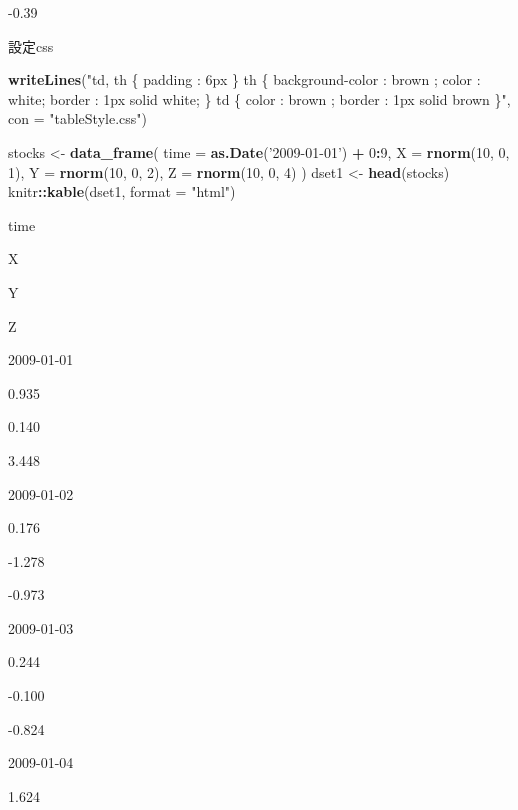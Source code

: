 \documentclass[]{book}
\newenvironment{Shaded}{\begin{snugshade}}{\end{snugshade}}
\newcommand{\KeywordTok}[1]{\textcolor[rgb]{0.13,0.29,0.53}{\textbf{#1}}}
\newcommand{\DataTypeTok}[1]{\textcolor[rgb]{0.13,0.29,0.53}{#1}}
\newcommand{\DecValTok}[1]{\textcolor[rgb]{0.00,0.00,0.81}{#1}}
\newcommand{\StringTok}[1]{\textcolor[rgb]{0.31,0.60,0.02}{#1}}
\newcommand{\OperatorTok}[1]{\textcolor[rgb]{0.81,0.36,0.00}{\textbf{#1}}}
\newcommand{\NormalTok}[1]{#1}
\theoremstyle{definition}
\theoremstyle{definition}
\theoremstyle{definition}
\theoremstyle{remark}
\begin{document}
-0.39

設定css

\begin{Shaded}
\begin{Highlighting}[]
\KeywordTok{writeLines}\NormalTok{(}\StringTok{"td, th \{ padding : 6px \} th \{ background-color : brown ; color : white; border : 1px solid white; \} td \{ color : brown ; border : 1px solid brown \}"}\NormalTok{, }\DataTypeTok{con =} \StringTok{"tableStyle.css"}\NormalTok{)}
\end{Highlighting}
\end{Shaded}

\begin{Shaded}
\begin{Highlighting}[]
\NormalTok{stocks <-}\StringTok{ }\KeywordTok{data_frame}\NormalTok{(}
  \DataTypeTok{time =} \KeywordTok{as.Date}\NormalTok{(}\StringTok{'2009-01-01'}\NormalTok{) }\OperatorTok{+}\StringTok{ }\DecValTok{0}\OperatorTok{:}\DecValTok{9}\NormalTok{,}
  \DataTypeTok{X =} \KeywordTok{rnorm}\NormalTok{(}\DecValTok{10}\NormalTok{, }\DecValTok{0}\NormalTok{, }\DecValTok{1}\NormalTok{),}
  \DataTypeTok{Y =} \KeywordTok{rnorm}\NormalTok{(}\DecValTok{10}\NormalTok{, }\DecValTok{0}\NormalTok{, }\DecValTok{2}\NormalTok{),}
  \DataTypeTok{Z =} \KeywordTok{rnorm}\NormalTok{(}\DecValTok{10}\NormalTok{, }\DecValTok{0}\NormalTok{, }\DecValTok{4}\NormalTok{)}
\NormalTok{)}
\NormalTok{dset1 <-}\StringTok{ }\KeywordTok{head}\NormalTok{(stocks)}
\NormalTok{knitr}\OperatorTok{::}\KeywordTok{kable}\NormalTok{(dset1, }\DataTypeTok{format =} \StringTok{"html"}\NormalTok{)}
\end{Highlighting}
\end{Shaded}

time

X

Y

Z

2009-01-01

0.935

0.140

3.448

2009-01-02

0.176

-1.278

-0.973

2009-01-03

0.244

-0.100

-0.824

2009-01-04

1.624
\end{document}
